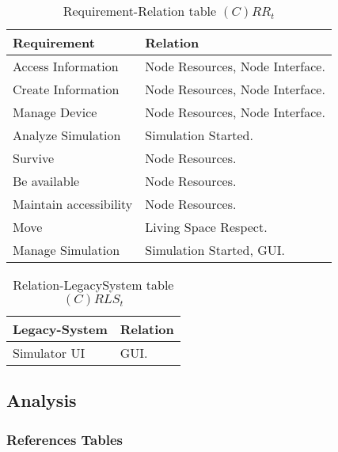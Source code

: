 \begin{table}[H]
	\centering
	\begin{tabular}{|p{4cm}|p{8cm}|}
			\hline
			\textbf{Requirement} & \textbf{Relation} \\
			\hline
			Access Information & Node Resources, Node Interface.  \\
			\hline
			Create Information & Node Resources, Node Interface.  \\
			\hline
			Manage Device & Node Resources, Node Interface.  \\
			\hline
			Analyze Simulation & Simulation Started. \\
			\hline
			Survive & Node Resources. \\
			\hline
			Be available & Node Resources. \\
			\hline
			Maintain accessibility & Node Resources. \\
			\hline
			Move & Living Space Respect. \\
			\hline
			Manage Simulation & Simulation Started, GUI. \\
			\hline
		\end{tabular}
	\caption{Requirement-Relation table $(C)RR_t$}
	\label{tab:crrt}
\end{table}

\begin{table}[H]
	\centering
	\begin{tabular}{|p{4cm}|p{8cm}|}
			\hline
			\textbf{Legacy-System} & \textbf{Relation} \\
			\hline
			Simulator UI & GUI. \\
			\hline
		\end{tabular}
	\caption{Relation-LegacySystem table $(C)RLS_t$}
	\label{tab:crlst}
\end{table}


\subsection{Analysis}

\subsubsection{References Tables}

